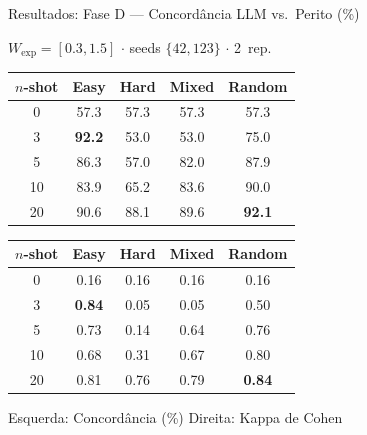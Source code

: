 \documentclass[aspectratio=169, 8pt]{beamer}
\begin{document}
\begin{frame}{Resultados: Fase D --- Concordância LLM vs.\ Perito (\%)}
  \scriptsize
  \begin{block}{\footnotesize $W_{\text{exp}}=[0.3,1.5]$ $\cdot$ seeds $\{42,123\}$ $\cdot$ 2~rep.}
  \end{block}

  \vspace{0.15em}

  \begin{center}
  \renewcommand{\arraystretch}{1.25}
  \begin{tabular}{ccccc}
    \toprule
    \textbf{$n$-shot} & \textbf{Easy} & \textbf{Hard} & \textbf{Mixed} & \textbf{Random} \\
    \midrule
    0  & 57.3 & 57.3 & 57.3 & 57.3 \\
    3  & \cellcolor{mygreen!30}\textbf{92.2} & \cellcolor{myred!20}53.0 & \cellcolor{myred!20}53.0 & 75.0 \\
    5  & 86.3 & 57.0 & 82.0 & 87.9 \\
    10 & 83.9 & 65.2 & 83.6 & \cellcolor{myblue!20}90.0 \\
    20 & 90.6 & 88.1 & 89.6 & \cellcolor{myblue!20}\textbf{92.1} \\
    \bottomrule
  \end{tabular}
  \hspace{1.5em}
  \begin{tabular}{ccccc}
    \toprule
    \textbf{$n$-shot} & \textbf{Easy} & \textbf{Hard} & \textbf{Mixed} & \textbf{Random} \\
    \midrule
    0  & 0.16 & 0.16 & 0.16 & 0.16 \\
    3  & \cellcolor{mygreen!30}\textbf{0.84} & \cellcolor{myred!20}0.05 & \cellcolor{myred!20}0.05 & 0.50 \\
    5  & 0.73 & 0.14 & 0.64 & 0.76 \\
    10 & 0.68 & 0.31 & 0.67 & \cellcolor{myblue!20}0.80 \\
    20 & 0.81 & 0.76 & 0.79 & \cellcolor{myblue!20}\textbf{0.84} \\
    \bottomrule
  \end{tabular}

  {\tiny Esquerda: Concordância (\%) \quad\quad Direita: Kappa de Cohen}
  \end{center}

  \vspace{0.15em}


\end{frame}
\end{document}
